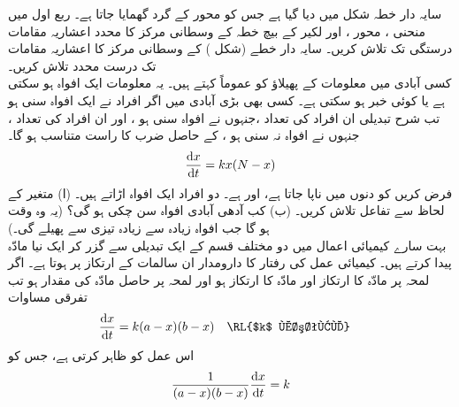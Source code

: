 سایہ دار خطہ شکل  میں دیا گیا ہے جس کو محور   کے گرد گھمایا جاتا ہے۔
ربع اول میں منحنی ، محور  ، اور لکیر   کے بیچ خطہ کے وسطانی مرکز کا  محدد  اعشاریہ مقامات  درستگی تک تلاش کریں۔
سایہ دار خطے  (شکل ) کے وسطانی مرکز کا  اعشاریہ مقامات تک درست  محدد  تلاش کریں۔
\\
کسی آبادی  میں معلومات کے پھیلاؤ کو  عموماً  کہتے ہیں۔ یہ معلومات ایک افواہ ہو سکتی ہے یا کوئی خبر ہو سکتی ہے۔ کسی بھی بڑی آبادی  میں اگر  افراد نے ایک افواہ سنی ہو تب  شرح تبدیلی  ان افراد کی تعداد ،جنہوں نے افواہ سنی ہو    ، اور ان افراد کی تعداد ، جنہوں نے افواہ نہ سنی ہو ، کے حاصل ضرب کا راست متناسب ہو گا۔ 
\begin{align*}
\frac{\dif x}{\dif t}=kx(N-x)
\end{align*}
فرض کریں   کو دنوں میں   ناپا جاتا ہے،    اور  ہے۔ دو افراد ایک افواہ اڑاتے ہیں۔ (ا) متغیر  کے لحاظ سے تفاعل  تلاش کریں۔ (ب) کب آدھی آبادی افواہ سن چکی ہو گی؟ (یہ وہ وقت ہو گا جب افواہ زیادہ سے زیادہ تیزی سے پھیلے گی۔)  
\\
بہت سارے کیمیائی اعمال میں دو مختلف قسم کے  ایک تبدیلی سے گزر کر ایک نیا مادّہ پیدا کرتے ہیں۔ کیمیائی عمل کی رفتار کا دارومدار ان سالمات  کے ارتکاز پر ہوتا ہے۔ اگر لمحہ  پر مادّہ  کا ارتکاز  اور مادّہ  کا ارتکاز  ہو اور لمحہ  پر حاصل مادّہ کی مقدار  ہو تب  تفرقی مساوات
\begin{align*}
\frac{\dif x}{\dif t}&=k(a-x)(b-x)&&\text{\RL{$k$ مستقل}}
\end{align*}
 اس عمل کو ظاہر کرتی ہے،  جس کو
\begin{align*}
\frac{1}{(a-x)(b-x)}\frac{\dif x}{\dif t}=k
\end{align*}
